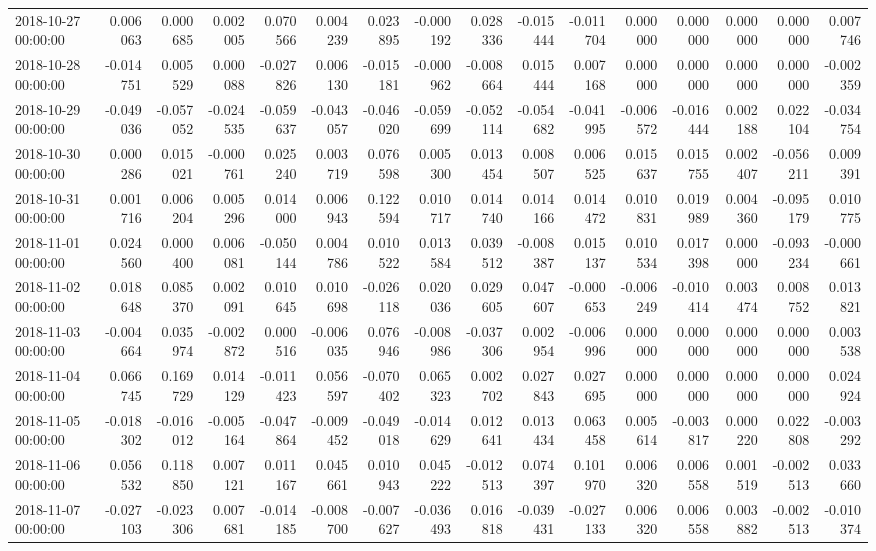 \begin{tabular}{lrrrrrrrrrrrrrrr}
2018-10-27 00:00:00 & 0.006063 & 0.000685 & 0.002005 & 0.070566 & 0.004239 & 0.023895 & -0.000192 & 0.028336 & -0.015444 & -0.011704 & 0.000000 & 0.000000 & 0.000000 & 0.000000 & 0.007746 \\
2018-10-28 00:00:00 & -0.014751 & 0.005529 & 0.000088 & -0.027826 & 0.006130 & -0.015181 & -0.000962 & -0.008664 & 0.015444 & 0.007168 & 0.000000 & 0.000000 & 0.000000 & 0.000000 & -0.002359 \\
2018-10-29 00:00:00 & -0.049036 & -0.057052 & -0.024535 & -0.059637 & -0.043057 & -0.046020 & -0.059699 & -0.052114 & -0.054682 & -0.041995 & -0.006572 & -0.016444 & 0.002188 & 0.022104 & -0.034754 \\
2018-10-30 00:00:00 & 0.000286 & 0.015021 & -0.000761 & 0.025240 & 0.003719 & 0.076598 & 0.005300 & 0.013454 & 0.008507 & 0.006525 & 0.015637 & 0.015755 & 0.002407 & -0.056211 & 0.009391 \\
2018-10-31 00:00:00 & 0.001716 & 0.006204 & 0.005296 & 0.014000 & 0.006943 & 0.122594 & 0.010717 & 0.014740 & 0.014166 & 0.014472 & 0.010831 & 0.019989 & 0.004360 & -0.095179 & 0.010775 \\
2018-11-01 00:00:00 & 0.024560 & 0.000400 & 0.006081 & -0.050144 & 0.004786 & 0.010522 & 0.013584 & 0.039512 & -0.008387 & 0.015137 & 0.010534 & 0.017398 & 0.000000 & -0.093234 & -0.000661 \\
2018-11-02 00:00:00 & 0.018648 & 0.085370 & 0.002091 & 0.010645 & 0.010698 & -0.026118 & 0.020036 & 0.029605 & 0.047607 & -0.000653 & -0.006249 & -0.010414 & 0.003474 & 0.008752 & 0.013821 \\
2018-11-03 00:00:00 & -0.004664 & 0.035974 & -0.002872 & 0.000516 & -0.006035 & 0.076946 & -0.008986 & -0.037306 & 0.002954 & -0.006996 & 0.000000 & 0.000000 & 0.000000 & 0.000000 & 0.003538 \\
2018-11-04 00:00:00 & 0.066745 & 0.169729 & 0.014129 & -0.011423 & 0.056597 & -0.070402 & 0.065323 & 0.002702 & 0.027843 & 0.027695 & 0.000000 & 0.000000 & 0.000000 & 0.000000 & 0.024924 \\
2018-11-05 00:00:00 & -0.018302 & -0.016012 & -0.005164 & -0.047864 & -0.009452 & -0.049018 & -0.014629 & 0.012641 & 0.013434 & 0.063458 & 0.005614 & -0.003817 & 0.000220 & 0.022808 & -0.003292 \\
2018-11-06 00:00:00 & 0.056532 & 0.118850 & 0.007121 & 0.011167 & 0.045661 & 0.010943 & 0.045222 & -0.012513 & 0.074397 & 0.101970 & 0.006320 & 0.006558 & 0.001519 & -0.002513 & 0.033660 \\
2018-11-07 00:00:00 & -0.027103 & -0.023306 & 0.007681 & -0.014185 & -0.008700 & -0.007627 & -0.036493 & 0.016818 & -0.039431 & -0.027133 & 0.006320 & 0.006558 & 0.003882 & -0.002513 & -0.010374 \\

\end{tabular}
